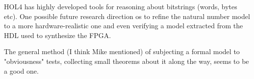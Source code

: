 \documentclass{llncs}
\begin{document}
HOL4 has highly developed tools  for reasoning about bitstrings (words, bytes etc).
One possible future research direction os to refine the natural number model to a more hardware-realistic one and even verifying a model extracted from the HDL used to synthesize the FPGA.

The general method (I think Mike mentioned) of subjecting a formal
model to "obviousness" tests, collecting small theorems about it along
the way, seems to be a good one.













\end{document}
